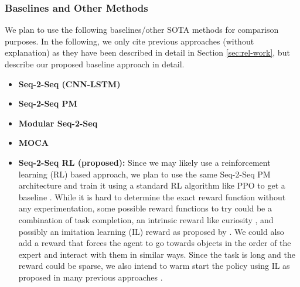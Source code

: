 \documentclass[11pt,a4paper]{article}
\begin{document}
\subsubsection{Baselines and Other Methods}
\label{sssec:baselines}
We plan to use the following baselines/other SOTA methods for comparison purposes. In the following, we only cite previous approaches (without explanation) as they have been described in detail in Section \ref{sec:rel-work}, but describe our proposed baseline approach in detail. 
\begin{itemize}
\item \textbf{Seq-2-Seq (CNN-LSTM)} \cite{shridhar2020alfred} %

\item \textbf{Seq-2-Seq PM} \cite{shridhar2020alfred} %

\item \textbf{Modular Seq-2-Seq} \cite{corona2020modularity}

\item \textbf{MOCA} \cite{singh2020moca} 

\item \textbf{Seq-2-Seq RL (proposed):}  Since we may likely use a reinforcement learning (RL) based approach, we plan to use the same Seq-2-Seq PM architecture and train it using a standard RL algorithm like PPO to get a baseline \cite{schulman2017proximal}. While it is hard to determine the exact reward function without any experimentation, some possible reward functions to try could be a combination of task completion, an intrinsic reward like curiosity \cite{burda2018large}, and possibly an imitation learning (IL) reward as proposed by . We could also add a reward that forces the agent to go towards objects in the order of the expert and interact with them in similar ways. Since the task is long and the reward could be sparse, we also intend to warm start the policy using IL as proposed in many previous approaches \cite{rajeswaran2017learning,wang2019reinforced}.
\end{itemize}

\end{document}
